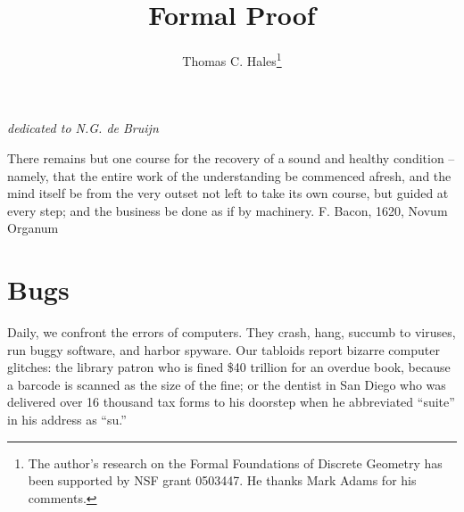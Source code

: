 \documentclass{llncs}
\begin{document}
\title{Formal Proof}%
\author{Thomas C. Hales\thanks{The author's research on the Formal Foundations of Discrete Geometry has been supported by NSF grant 0503447.  He thanks Mark Adams for his comments.}}
\maketitle


\centerline{\it dedicated to N.G. de Bruijn}


\bigskip

{\narrower\it 

There remains but one course 
for the recovery of a sound and healthy condition --
namely, that the entire work of the understanding be commenced afresh, and the mind itself be from the very outset not left to take its own course, but
guided at every step; and the business be done
as if by machinery.  F. Bacon, 1620, Novum Organum

}

\bigskip



\bigskip

\section{Bugs}

Daily, we confront the errors of computers.  They crash,
hang, succumb to viruses, run buggy software, and harbor
spyware.  Our  tabloids report bizarre computer glitches:
the library patron who is fined \$40 trillion for an overdue
book, because a  
barcode is scanned as the size of the fine; or the 
dentist in San Diego who was delivered over 16 thousand tax forms
to his doorstep when he abbreviated ``suite'' 
in his address as ``su.''
\end{document}
